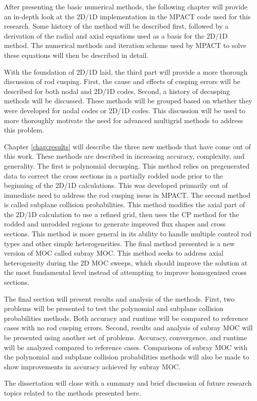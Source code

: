 After presenting the basic numerical methods, the following chapter will provide an in-depth look at the 2D/1D implementation in the MPACT code used for this research.  Some history of the method will be described first, followed by a derivation of the radial and axial equations used as a basis for the 2D/1D method.  The numerical methods and iteration scheme used by MPACT to solve these equations will then be described in detail.

With the foundation of 2D/1D laid, the third part will provide a more thorough discussion of rod cusping.  First, the cause and effects of cusping errors will be described for both nodal and 2D/1D codes.  Second, a history of decusping methods will be discussed.  These methods will be grouped based on whether they were developed for nodal codes or 2D/1D codes.  This discussion will be used to more thoroughly motivate the need for advanced multigrid methods to address this problem.

Chapter \ref{chap:results} will describe the three new methods that have come out of this work.  These methods are described in increasing accuracy, complexity, and generality.  The first is polynomial decusping.  This method relies on pregenerated data to correct the cross sections in a partially rodded node prior to the beginning of the 2D/1D calculations.  This was developed primarily out of immediate need to address the rod cusping issue in MPACT.  The second method is called subplane collision probabilities.  This method modifies the axial part of the 2D/1D calculation to use a refined grid, then uses the CP method for the rodded and unrodded regions to generate improved flux shapes and cross sections.  This method is more general in its ability to handle multiple control rod types and other simple heterogeneities.  The final method presented is a new version of MOC called subray MOC.  This method seeks to address axial heterogeneity during the 2D MOC sweeps, which should improve the solution at the most fundamental level instead of attempting to improve homogenized cross sections.

The final section will present results and analysis of the methods.  First, two problems will be presented to test the polynomial and subplane collision probabilities methods.  Both accuracy and runtime will be compared to reference cases with no rod cusping errors.  Second, results and analysis of subray MOC will be presented using another set of problems.  Accuracy, convergence, and runtime will be analyzed compared to reference cases.  Comparisons of subray MOC with the polynomial and subplane collision probabilities methods will also be made to show improvements in accuracy achieved by subray MOC.

The dissertation will close with a summary and brief discussion of future research topics related to the methods presented here.